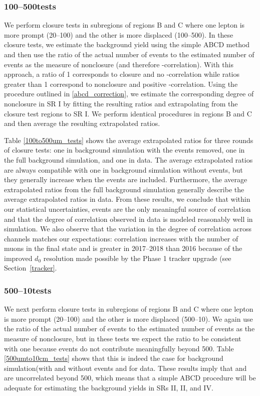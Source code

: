 \subsubsection{100--500\mum tests}
We perform closure tests in subregions of regions B and C where one lepton is more prompt (20--100\mum) and the other is more displaced (100--500\mum). In these closure tests, we estimate the background yield using the simple ABCD method and then use the ratio of the actual number of events to the estimated number of events as the measure of nonclosure (and therefore \ada-\adb correlation). With this approach, a ratio of 1 corresponds to closure and no \ada-\adb correlation while ratios greater than 1 correspond to nonclosure and positive \ada-\adb correlation. Using the procedure outlined in \ref{abcd_correction}, we estimate the corresponding degree of nonclosure in SR I by fitting the resulting ratios and extrapolating from the closure test regions to SR I. We perform identical procedures in regions B and C and then average the resulting extrapolated ratios.

Table \ref{100to500um_tests} shows the average extrapolated ratios for three rounds of closure tests: one in background simulation with the \ztautaull events removed, one in the full background simulation, and one in data. The average extrapolated ratios are always compatible with one in background simulation without \ztautaull events, but they generally increase when the \ztautaull events are included. Furthermore, the average extrapolated ratios from the full background simulation generally describe the average extrapolated ratios in data. From these results, we conclude that within our statistical uncertainties, \ztautaull events are the only meaningful source of correlation and that the degree of correlation observed in data is modeled reasonably well in simulation. We also observe that the variation in the degree of correlation across channels matches our expectations: correlation increases with the number of muons in the final state and is greater in 2017--2018 than 2016 because of the improved $d_0$ resolution made possible by the Phase 1 tracker upgrade (see Section~\ref{tracker}.



\subsubsection{500\mum--10\cm tests}
We next perform closure tests in subregions of regions B and C where one lepton is more prompt (20--100\mum) and the other is more displaced (500\mum--10\cm). We again use the ratio of the actual number of events to the estimated number of events as the measure of nonclosure, but in these tests we expect the ratio to be consistent with one because \ztautaull events do not contribute meaningfully beyond 500\mum. Table \ref{500umto10cm_tests} shows that this is indeed the case for background simulation(with and without \ztautaull events and for data. These results imply that \ada and \adb are uncorrelated beyond 500\mum, which means that a simple ABCD procedure will be adequate for estimating the background yields in SRs II, II, and IV.

